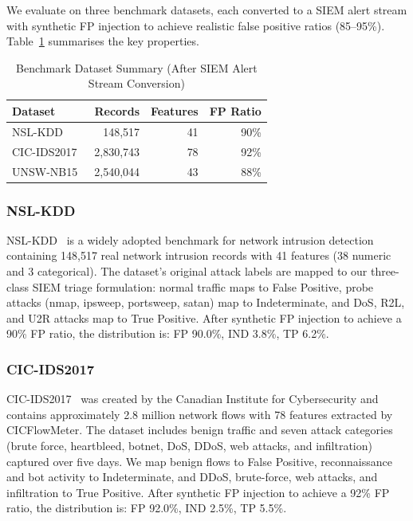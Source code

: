 \documentclass[conference]{IEEEtran}
\begin{document}
We evaluate on three benchmark datasets, each converted to a SIEM alert stream
with synthetic FP injection to achieve realistic false positive ratios (85--95\%).
Table~\ref{tab:datasets} summarises the key properties.

\begin{table}[t]
\centering
\caption{Benchmark Dataset Summary (After SIEM Alert Stream Conversion)}
\label{tab:datasets}
\renewcommand{\arraystretch}{1.1}
\begin{tabular}{l r r r}
\toprule
\textbf{Dataset} & \textbf{Records} & \textbf{Features} & \textbf{FP Ratio} \\
\midrule
NSL-KDD~\cite{tavallaee2009}          & 148,517   & 41 & 90\% \\
CIC-IDS2017~\cite{sharafaldin2018}    & 2,830,743 & 78 & 92\% \\
UNSW-NB15~\cite{moustafa2015}         & 2,540,044 & 43 & 88\% \\
\bottomrule
\end{tabular}
\end{table}

\subsubsection{NSL-KDD}
NSL-KDD~\cite{tavallaee2009} is a widely adopted benchmark for network intrusion
detection containing 148,517 real network intrusion records with 41 features
(38 numeric and 3 categorical).
The dataset's original attack labels are mapped to our three-class SIEM triage
formulation: normal traffic maps to False Positive, probe attacks (nmap, ipsweep,
portsweep, satan) map to Indeterminate, and DoS, R2L, and U2R attacks map to
True Positive.  After synthetic FP injection to achieve a 90\% FP ratio, the
distribution is: FP 90.0\%, IND 3.8\%, TP 6.2\%.

\subsubsection{CIC-IDS2017}
CIC-IDS2017~\cite{sharafaldin2018} was created by the Canadian Institute for
Cybersecurity and contains approximately 2.8 million network flows with 78
features extracted by CICFlowMeter.  The dataset includes benign traffic and
seven attack categories (brute force, heartbleed, botnet, DoS, DDoS, web attacks,
and infiltration) captured over five days.
We map benign flows to False Positive, reconnaissance and bot activity to
Indeterminate, and DDoS, brute-force, web attacks, and infiltration to True
Positive.  After synthetic FP injection to achieve a 92\% FP ratio, the
distribution is: FP 92.0\%, IND 2.5\%, TP 5.5\%.
\end{document}
